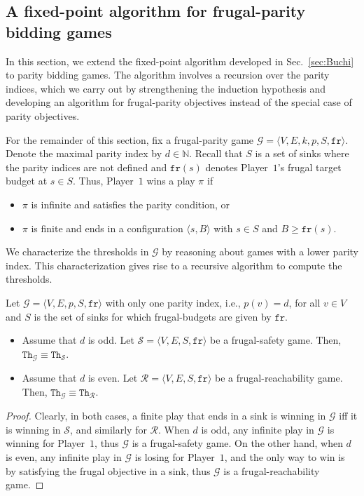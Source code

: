 \documentclass{theoretics}
\newcommand{\PO}{Player~$1$\xspace}
\newcommand{\G}{{\mathcal G}}
\newcommand{\R}{{\mathcal R}}
\renewcommand{\S}{{\mathcal S}}
\newcommand{\fr}{\texttt{fr}}
\newcommand{\Nat}{\mathbb{N}}
\newcommand{\thresh}{\texttt{Th}\xspace}
\newcommand{\zug}[1]{\langle #1  \rangle}
\begin{document}
\subsection{A fixed-point algorithm for frugal-parity bidding games}
In this section, we extend the fixed-point algorithm developed in Sec.~\ref{sec:Buchi} to parity bidding games. The algorithm involves a recursion over the parity indices, which we carry out by strengthening the induction hypothesis and developing an algorithm for frugal-parity objectives instead of the special case of parity objectives. 

For the remainder of this section, fix a frugal-parity game $\G = \zug{V, E, k, p, S, \fr}$. Denote the maximal parity index by $d \in \Nat$. 
Recall that $S$ is a set of sinks where the parity indices are not defined and $\fr(s)$ denotes \PO's frugal target budget at $s \in S$. Thus, \PO wins a play $\pi$ if 
\begin{itemize}
\item $\pi$ is infinite and satisfies the parity condition, or 
\item $\pi$ is finite and ends in a configuration $\zug{s, B}$ with $s \in S$ and $B \geq \fr(s)$.
\end{itemize}

We characterize the thresholds in $\G$ by reasoning about games with a lower parity index. This characterization gives rise to a recursive algorithm to compute the thresholds.


\begin{lemma}
Let $\G = \zug{V, E, p, S, \fr}$ with only one parity index, i.e., $p(v) = d$, for all $v \in V$ and \(S\) is the set of sinks for which frugal-budgets are given by \(\fr\). 
\begin{itemize}
\item Assume that $d$ is odd. Let $\S = \zug{V, E, S, \fr}$ be a frugal-safety game. Then, $\thresh_\G \equiv \thresh_\S$. 
\item Assume that $d$ is even. Let $\R = \zug{V, E, S, \fr}$ be a frugal-reachability game. Then, $\thresh_\G \equiv \thresh_\R$. 
\end{itemize}
\end{lemma}
\begin{proof}
Clearly, in both cases, a finite play that ends in a sink is winning in $\G$ iff it is winning in $\S$, and similarly for $\R$. 
When $d$ is odd, any infinite play in $\G$ is winning for \PO, thus $\G$ is a frugal-safety game. On the other hand, when $d$ is even, any infinite play in $\G$ is losing for \PO, and the only way to win is by satisfying the frugal objective in a sink, thus $\G$ is a frugal-reachability game. 
\end{proof}
\end{document}
